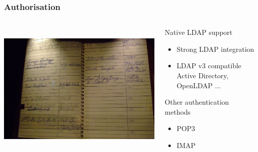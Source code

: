 \documentclass{beamer}
\begin{document}
\begin{frame}
    \frametitle{Authorisation}


 \begin{columns}
 \begin{column}{0.34\textwidth}
    \includegraphics[height=6.5cm]{pics/addressbook.jpg}
 \end{column}
 \begin{column}{0.90\textwidth}
    \begin{block}{Native LDAP support}
        \begin{itemize}
            \item Strong LDAP integration
            \item LDAP v3 compatible \\
            {\small Active Directory, OpenLDAP ...}
        \end{itemize}
    \end{block}

    \begin{block}{Other authentication methods}
        \begin{itemize}
            \item POP3
            \item IMAP
        \end{itemize}
    \end{block}
 \end{column}
\end{columns}
\end{frame}
\end{document}
